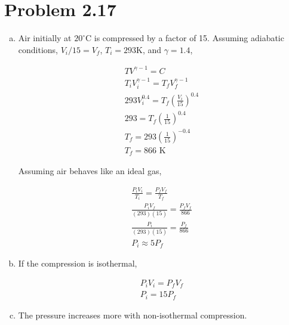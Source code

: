 \documentclass[12pt,a4paper]{article}
\begin{document}
\setcounter{page}{1}

\section*{Problem 2.17}
\bigskip

\begin{enumerate}[(a)]

\item Air initially at $20^\circ$C is compressed by a factor of 15. Assuming adiabatic conditions, $V_i/15 = V_f$, $T_i = 293$K, and $\gamma = 1.4$,

\begin{eqnarray}
	TV^{\gamma -1} = C \label{eq:adiabatic} \\
	T_i V_i^{\gamma-1} = T_f V_f^{\gamma - 1} \nonumber \\
	293 V_i^{0.4} = T_f \left( \frac{V_i}{15} \right)^{0.4} \nonumber \\
	293 = T_f \left(\frac{1}{15}\right)^{0.4} \nonumber \\
	T_f = 293 \left( \frac{1}{15} \right)^{-0.4} \nonumber \\
	\boxed{T_f = 866\textrm{ K}} \label{eq:answer1}
\end{eqnarray}

Assuming air behaves like an ideal gas,

\begin{eqnarray}
	\frac{P_i V_i}{T_i} = \frac{P_f V_f}{T_f} \\
	\frac{P_i V_f}{(293)(15)} = \frac{P_f V_f}{866} \nonumber \\
	\frac{P_i}{(293)(15)} = \frac{P_f}{866} \nonumber \\
	\boxed{P_i \approx 5 P_f} \label{eq:answer2}
\end{eqnarray}

\item If the compression is isothermal,

\begin{eqnarray}
	P_i V_i = P_f V_f \\
	\boxed{P_i = 15 P_f} \label{eq:answer3}
\end{eqnarray}

\item The pressure increases more with non-isothermal compression.

\end{enumerate}
\end{document}

